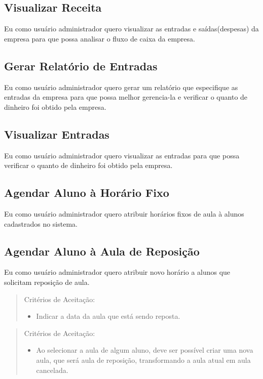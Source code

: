\subsection[Visualizar Receita]{Visualizar Receita}
Eu como usuário administrador quero visualizar as entradas e saídas(despesas) da empresa
para que possa analisar o fluxo de caixa da empresa.

\subsection[Gerar Relatório de Entradas]{Gerar Relatório de Entradas}
Eu como usuário administrador quero gerar um relatório que especifique as
entradas da empresa para que possa melhor gerencia-la e verificar o quanto de
dinheiro foi obtido pela empresa.

\subsection[Visualizar Entradas]{Visualizar Entradas}
Eu como usuário administrador quero visualizar as entradas para que possa
verificar o quanto de dinheiro foi obtido pela empresa.

\subsection[Agendar Aluno à Horário Fixo]{Agendar Aluno à Horário Fixo}
Eu como usuário administrador quero atribuir horários fixos de aula à alunos
cadastrados no sistema.

\subsection[Agendar Aluno à Aula de Reposição]{Agendar Aluno à Aula de Reposição}
Eu como usuário administrador quero atribuir novo horário a alunos que solicitam
reposição de aula.

\begin{quote}
Critérios de Aceitação:
    \begin{itemize}
        \item Indicar a data da aula que está sendo reposta.
    \end{itemize}
\end{quote}


\begin{quote}
Critérios de Aceitação:
    \begin{itemize}
        \item Ao selecionar a aula de algum aluno, deve ser possível criar uma nova aula,
        que será aula de reposição, transformando a aula atual em aula cancelada.
    \end{itemize}
\end{quote}

